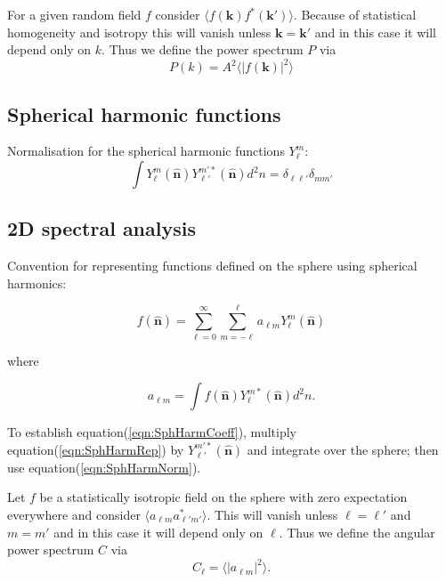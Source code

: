 \documentclass[11pt]{article}
\begin{document}
For a given random field $f$ consider $\langle f(\boldsymbol{k})f^{\ast}(\boldsymbol{k}')\rangle$. Because of statistical homogeneity and isotropy this will vanish unless $\boldsymbol{k} = \boldsymbol{k}'$ and in this case it will depend only on $k$. Thus we define the power spectrum $P$ via
\begin{equation}
P(k) = A^{2} \langle | f(\boldsymbol{k}) | ^2 \rangle
\end{equation}


\subsection{Spherical harmonic functions}

Normalisation for the spherical harmonic functions $Y_{\ell}^m$:
\begin{equation}
\label{eqn:SphHarmNorm}
\int {Y_\ell^m(\boldsymbol{\hat{n}})} {Y_{\ell'}^{m' \ast}(\boldsymbol{\hat{n}})}d^2n = \delta_{\ell \ell'} \delta_{m m'}
\end{equation}



\subsection{2D spectral analysis}

Convention for representing functions defined on the sphere using spherical harmonics:

\begin{equation}
\label{eqn:SphHarmRep}
f(\boldsymbol{\hat{n}}) = \sum_{\ell=0}^\infty \sum_{m=-\ell}^{\ell} a_{\ell m} Y_{\ell}^m(\boldsymbol{\hat{n}})
\end{equation}

\noindent where

\begin{equation}
\label{eqn:SphHarmCoeff}
a_{\ell m} = \int f(\boldsymbol{\hat{n}}) Y_{\ell}^{m \ast}(\boldsymbol{\hat{n}}) d^2n.
\end{equation}

\noindent To establish equation(\ref{eqn:SphHarmCoeff}), multiply equation(\ref{eqn:SphHarmRep}) by $Y_{\ell'}^{m'*}(\boldsymbol{\hat{n}})$ and integrate over the sphere; then use equation(\ref{eqn:SphHarmNorm}).


Let $f$ be a statistically isotropic field on the sphere with zero expectation everywhere and consider $\langle a_{\ell m} a^{\ast}_{\ell' m'} \rangle$. This will vanish unless $\ell = \ell'$ and $m=m'$ and in this case it will depend only on $\ell$. Thus we define the angular power spectrum $C$ via
\begin{equation}
C_{\ell} = \langle | a_{\ell m} | ^2 \rangle.
\end{equation}
\end{document}
